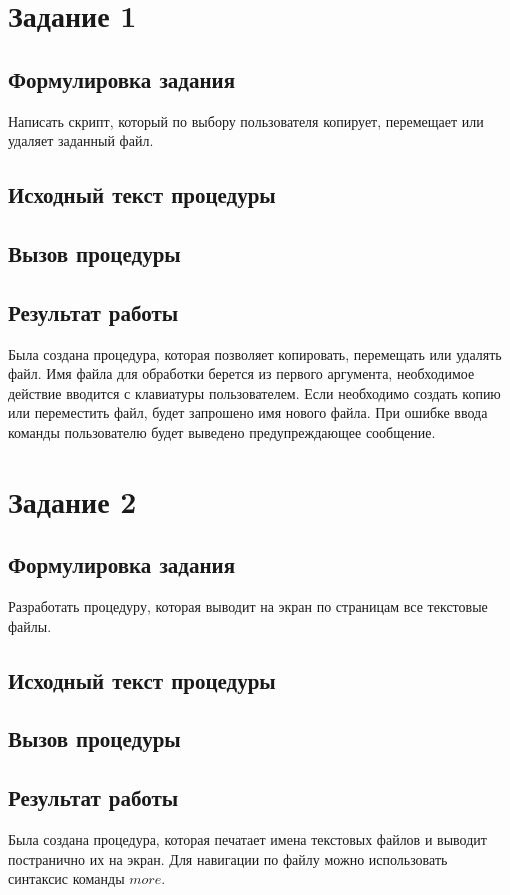 \documentclass[a4paper,14pt]{article}
\begin{document}


\tableofcontents
\pagebreak

\section{Задание 1}

\subsection{Формулировка задания}
Написать скрипт, который по выбору пользователя копирует, перемещает или удаляет заданный файл.

\subsection{Исходный текст процедуры}
{\small }
\subsection{Вызов процедуры}
{\small }
\subsection{Результат работы}
Была создана процедура, которая позволяет копировать, перемещать или удалять файл. 
Имя файла для обработки берется из первого аргумента, необходимое действие вводится с клавиатуры пользователем.
Если необходимо создать копию или переместить файл, будет запрошено имя нового файла.
При ошибке ввода команды пользователю будет выведено предупреждающее сообщение.

\section{Задание 2}

\subsection{Формулировка задания}
Разработать процедуру, которая выводит на экран по страницам все текстовые файлы.

\subsection{Исходный текст процедуры}
{\small }
\subsection{Вызов процедуры}
{\small }
\subsection{Результат работы}
Была создана процедура, которая печатает имена текстовых файлов и выводит постранично их на экран.
Для навигации по файлу можно использовать синтаксис команды $more$.
\end{document}
